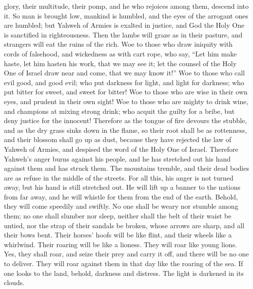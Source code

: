 glory, their multitude, their pomp, and he who rejoices among them,
descend into it.  So man is brought low, mankind is
humbled, and the eyes of the arrogant ones are humbled; 
but Yahweh of Armies is exalted in justice, and God the Holy One is
sanctified in righteousness.  Then the lambs will graze
as in their pasture, and strangers will eat the ruins of the rich.
 Woe to those who draw iniquity with cords of falsehood,
and wickedness as with cart rope,  who say, ``Let him
make haste, let him hasten his work, that we may see it; let the counsel
of the Holy One of Israel draw near and come, that we may know it!''
 Woe to those who call evil good, and good evil; who put
darkness for light, and light for darkness; who put bitter for sweet,
and sweet for bitter!  Woe to those who are wise in their
own eyes, and prudent in their own sight!  Woe to those
who are mighty to drink wine, and champions at mixing strong drink;
 who acquit the guilty for a bribe, but deny justice for
the innocent!  Therefore as the tongue of fire devours
the stubble, and as the dry grass sinks down in the flame, so their root
shall be as rottenness, and their blossom shall go up as dust, because
they have rejected the law of Yahweh of Armies, and despised the word of
the Holy One of Israel.  Therefore Yahweh's anger burns
against his people, and he has stretched out his hand against them and
has struck them. The mountains tremble, and their dead bodies are as
refuse in the middle of the streets. For all this, his anger is not
turned away, but his hand is still stretched out.  He
will lift up a banner to the nations from far away, and he will whistle
for them from the end of the earth. Behold, they will come speedily and
swiftly.  No one shall be weary nor stumble among them;
no one shall slumber nor sleep, neither shall the belt of their waist be
untied, nor the strap of their sandals be broken,  whose
arrows are sharp, and all their bows bent. Their horses' hoofs will be
like flint, and their wheels like a whirlwind.  Their
roaring will be like a lioness. They will roar like young lions. Yes,
they shall roar, and seize their prey and carry it off, and there will
be no one to deliver.  They will roar against them in
that day like the roaring of the sea. If one looks to the land, behold,
darkness and distress. The light is darkened in its clouds.

